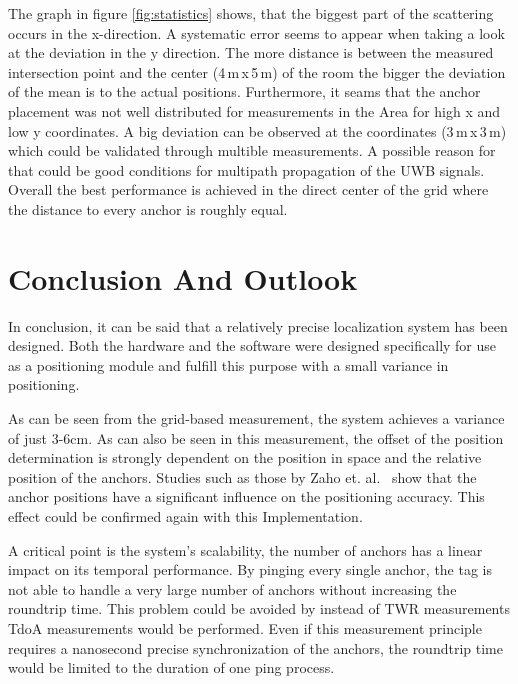 \documentclass[conference, a4paper]{IEEEtran}
\begin{document}
The graph in figure \ref{fig:statistics} shows, that the biggest part of the scattering occurs in the x-direction. 
A systematic error seems to appear when taking a look at the deviation in the y direction. 
The more distance is between the measured intersection point and the center (4\,m\,x\,5\,m) of the room the bigger the deviation of the mean is to the actual positions. 
Furthermore, it seams that the anchor placement was not well distributed for measurements in the Area for high x and low y coordinates. 
A big deviation can be observed at the coordinates (3\,m\,x\,3\,m) which could be validated through multible measurements.
A possible reason for that could be good conditions for multipath propagation of the \ac{UWB} signals.
Overall the best performance is achieved in the direct center of the grid where the distance to every anchor is roughly equal.



\section{Conclusion And Outlook}\label{section:conclusion}
In conclusion, it can be said that a relatively precise localization system has been designed.
Both the hardware and the software were designed specifically for use as a positioning module
and fulfill this purpose with a small variance in positioning.

As can be seen from the grid-based measurement, the system achieves a variance of just 3-6cm.
As can also be seen in this measurement,
the offset of the position determination is strongly dependent on the position in space
and the relative position of the anchors.
Studies such as those by Zaho et. al.~\cite{Zhao_2022} show that the anchor positions
have a significant influence on the positioning accuracy.
This effect could be confirmed again with this Implementation.

A critical point is the system's scalability, the number of anchors has a linear impact on its temporal performance.
By pinging every single anchor, the tag is not able to handle a very large number of anchors without increasing the roundtrip time.
This problem could be avoided by instead of \ac{TWR} measurements \ac{TdoA} measurements would be performed.
Even if this measurement principle requires a nanosecond precise synchronization of the anchors,
the roundtrip time would be limited to the duration of one ping process.
\end{document}
